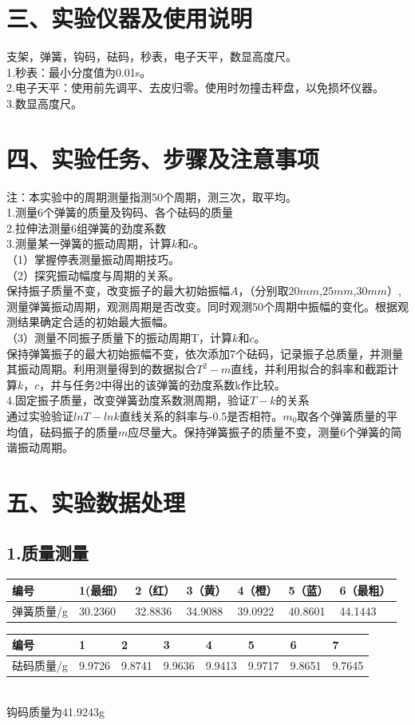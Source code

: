 \documentclass[UTF8]{ctexart}
\begin{document}
\section*{三、实验仪器及使用说明}
支架，弹簧，钩码，砝码，秒表，电子天平，数显高度尺。\\
1.秒表：最小分度值为0.01s。\\
2.电子天平：使用前先调平、去皮归零。使用时勿撞击秤盘，以免损坏仪器。\\
3.数显高度尺。\\
\section*{四、实验任务、步骤及注意事项}
注：本实验中的周期测量指测50个周期，测三次，取平均。\\
1.测量6个弹簧的质量及钩码、各个砝码的质量\\
2.拉伸法测量6组弹簧的劲度系数\\
3.测量某一弹簧的振动周期，计算$k$和$c$。\\
（1）掌握停表测量振动周期技巧。\\
（2）探究振动幅度与周期的关系。\\
保持振子质量不变，改变振子的最大初始振幅$A$，（分别取$20mm$,$25mm$,$30mm$）,测量弹簧振动周期，观测周期是否改变。同时观测50个周期中振幅的变化。根据观测结果确定合适的初始最大振幅。\\
（3）测量不同振子质量下的振动周期T，计算$k$和$c$。\\
保持弹簧振子的最大初始振幅不变，依次添加7个砝码，记录振子总质量，并测量其振动周期。利用测量得到的数据拟合$T^2-m$直线，并利用拟合的斜率和截距计算$k$，$c$，并与任务2中得出的该弹簧的劲度系数k作比较。\\
4.固定振子质量，改变弹簧劲度系数测周期，验证$T-k$的关系\\
通过实验验证$lnT-lnk$直线关系的斜率与-0.5是否相符。$m_0$取各个弹簧质量的平均值，砝码振子的质量$m$应尽量大。保持弹簧振子的质量不变，测量6个弹簧的简谐振动周期。\\
\section*{五、实验数据处理}
\subsection*{1.质量测量}
\begin{tabular}{|l|l|l|l|l|l|l|}
\hline
编号 &1(最细）&2（红） &3（黄）&4（橙）&5（蓝）&6（最粗）\\
\hline 
弹簧质量/g &30.2360&32.8836&34.9088&39.0922&40.8601&44.1443\\
\hline
\end{tabular}
\newline
\begin{tabular}{|l|l|l|l|l|l|l|l|}
\hline
编号 &1&2&3&4&5&6&7\\
\hline 
砝码质量/g &9.9726&9.8741&9.9636&9.9413&9.9717&9.8651&9.7645\\
\hline
\end{tabular}
\\
钩码质量为41.9243g
\end{document}
